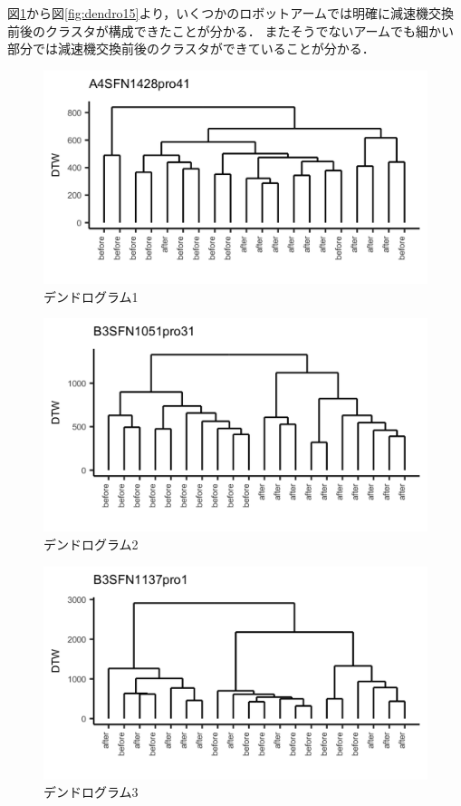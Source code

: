 \documentclass{jarticle}
\begin{document}
図\ref{fig:dendro1}から図\ref{fig:dendro15}より，いくつかのロボットアームでは明確に減速機交換前後のクラスタが構成できたことが分かる．
またそうでないアームでも細かい部分では減速機交換前後のクラスタができていることが分かる．

\begin{figure}[H]
	\begin{center}
		\includegraphics[width=15cm]{fig/dendro_1.png}
		\caption{デンドログラム1}
		\label{fig:dendro1}
	\end{center}
\end{figure}
\begin{figure}[H]
	\begin{center}
		\includegraphics[width=15cm]{fig/dendro_2.png}
		\caption{デンドログラム2}
		\label{fig:dendro2}
	\end{center}
\end{figure}
\begin{figure}[H]
	\begin{center}
		\includegraphics[width=15cm]{fig/dendro_3.png}
		\caption{デンドログラム3}
		\label{fig:dendro3}
	\end{center}
\end{figure}
\end{document}
